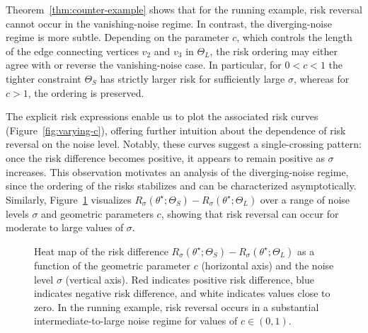 \documentclass[11pt]{article}
\theoremstyle{plain}
\theoremstyle{definition}
\begin{document}
Theorem~\ref{thm:counter-example} shows that for the running example, risk reversal cannot occur in the vanishing-noise regime. In contrast, the diverging-noise regime is more subtle. Depending on the parameter $c$, which controls the length of the edge connecting vertices $v_2$ and $v_3$ in $\Theta_L$, the risk ordering may either agree with or reverse the vanishing-noise case. In particular, for $0<c<1$ the tighter constraint $\Theta_S$ has strictly larger risk for sufficiently large $\sigma$, whereas
for $c>1$, the ordering is preserved.

The explicit risk expressions enable us to plot the associated risk curves (Figure~\ref{fig:varying-c}), offering further intuition about the dependence of risk reversal on the noise level. Notably, these curves suggest a single-crossing pattern: once the risk difference becomes positive, it appears to remain positive as $\sigma$ increases. This observation motivates an analysis of the diverging-noise regime, since the ordering of the risks stabilizes and can be characterized asymptotically. Similarly, Figure~\ref{fig:heatmap} visualizes $R_\sigma(\theta^\star; \Theta_S)-R_\sigma(\theta^\star; \Theta_L)$ over a range of noise levels $\sigma$ and geometric parameters $c$, showing that risk reversal can occur for moderate to large values of $\sigma$.


\begin{figure}[t]
\centering
{}
\caption{Heat map of the risk difference $R_\sigma(\theta^\star; \Theta_S)-R_\sigma(\theta^\star; \Theta_L)$ as a function of the geometric parameter $c$ (horizontal axis) and the noise level $\sigma$ (vertical axis). Red indicates positive risk difference, blue indicates negative risk difference, and white indicates values close to zero. In the running example, risk reversal occurs in a substantial intermediate-to-large noise regime for values of $c\in(0,1)$.}
 \label{fig:heatmap}
\end{figure}
\end{document}
